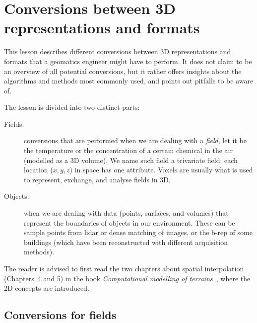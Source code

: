 
\setchapterpreamble[u]{\margintoc}

\graphicspath{{conversion/}}
\renewcommand*{\thelesson}{6.2}

\chapter{Conversions between 3D representations and formats}%
\label{chap:conversion}

This lesson describes different conversions between 3D representations and formats that a geomatics engineer might have to perform.
It does not claim to be an overview of all potential conversions, but it rather offers insights about the algorithms and methods most commonly used, and points out pitfalls to be aware of.

%

The lesson is divided into two distinct parts:
\begin{description}
  \item[Fields:] conversions that are performed when we are dealing with a \emph{field}, let it be the temperature or the concentration of a certain chemical in the air (modelled as a 3D volume).
  We name such field a trivariate field: each location ($x,y,z$) in space has one attribute.%
  Voxels are usually what is used to represent, exchange, and analyse fields in 3D.%
  \item[Objects:] when we are dealing with data (points, surfaces, and volumes) that represent the boundaries of objects in our environment. 
  These can be sample points from lidar or dense matching of images, or the b-rep of some buildings (which have been reconstructed with different acquisition methods).%
\end{description}

\begin{kaobox}[frametitle=\faExternalLink\ To read or to watch.]
  The reader is advised to first read the two chapters about spatial interpolation (Chapters~4 and 5) in the book \emph{Computational modelling of terrains}~\citep{terrain_book}, where the 2D concepts are introduced.
\end{kaobox}



%
\section{Conversions for fields}


